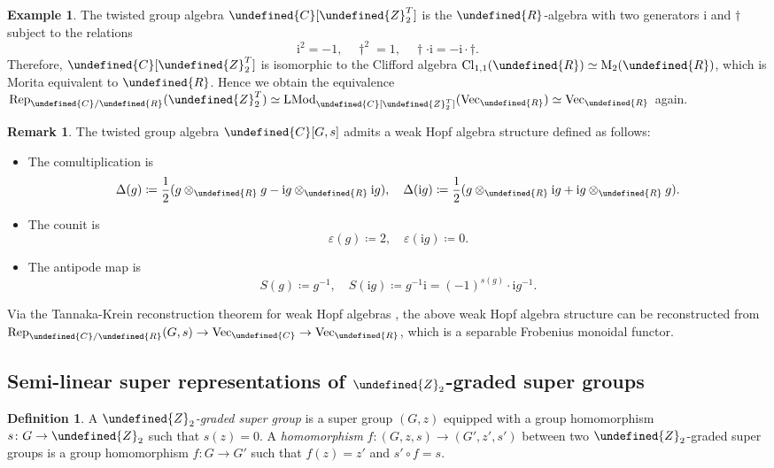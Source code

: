\documentclass[10pt]{article}
\let\mathbb\undefined
\theoremstyle{definition}
\newtheorem{defn}[thm]{Definition}
\newtheorem{expl}[thm]{Example}
\newtheorem{rem}[thm]{Remark}
\numberwithin{equation}{section}
\numberwithin{thm}{section}
\newcommand{\bit}{\begin{itemize}}
\newcommand{\eit}{\end{itemize}}
\newcommand{\Cb}{\mathbb{C}}
\newcommand{\Rb}{\mathbb{R}}
\newcommand{\Zb}{\mathbb{Z}}
\DeclareMathOperator{\LMod}{LMod}
\newcommand{\vect}{\mathrm{Vec}}
\newcommand{\rep}{\mathrm{Rep}}
\begin{document}
\begin{expl}
The twisted group algebra $\Cb[\Zb_2^T]$ is the $\Rb$-algebra with two generators $\mathrm i$ and $\dagger$ subject to the relations
\[
\mathrm i^2 = -1 , \quad \dagger^2 = 1 , \quad \dagger \cdot \mathrm i = -\mathrm i \cdot \dagger .
\]
Therefore, $\Cb[\Zb_2^T]$ is isomorphic to the Clifford algebra $\mathrm{Cl}_{1,1}(\Rb) \simeq \mathrm M_2(\Rb)$, which is Morita equivalent to $\Rb$. Hence we obtain the equivalence $\rep_{\Cb/\Rb}(\Zb_2^T) \simeq \LMod_{\Cb[\Zb_2^T]}(\vect_\Rb) \simeq \vect_\Rb$ again.
\end{expl}

\begin{rem}
The twisted group algebra $\Cb[G,s]$ admits a weak Hopf algebra structure defined as follows:
\bit
\item The comultiplication is
\[
\Delta(g) \coloneqq \frac12 (g \otimes_\Rb g - \mathrm i g \otimes_\Rb \mathrm i g) , \quad \Delta(\mathrm i g) \coloneqq \frac12 (g \otimes_\Rb \mathrm i g + \mathrm i g \otimes_\Rb g) .
\]
\item The counit is
\[
\varepsilon(g) \coloneqq 2 , \quad \varepsilon(\mathrm i g) \coloneqq 0 .
\]
\item The antipode map is
\[
S(g) \coloneqq g^{-1} , \quad S(\mathrm i g) \coloneqq g^{-1} \mathrm i = (-1)^{s(g)} \cdot \mathrm i g^{-1} .
\]
\eit
Via the Tannaka-Krein reconstruction theorem for weak Hopf algebras \cite{Szl01,Szl05}, the above weak Hopf algebra structure can be reconstructed from $\rep_{\Cb/\Rb}(G,s) \to \vect_\Cb \to \vect_\Rb$, which is a separable Frobenius monoidal functor.
\end{rem}


\subsection{Semi-linear super representations of \texorpdfstring{$\Zb_2$}{Z2}-graded super groups}

\begin{defn}
A \emph{$\Zb_2$-graded super group} is a super group $(G,z)$ equipped with a group homomorphism $s \colon G \to \Zb_2$ such that $s(z) = 0$. A \emph{homomorphism} $f \colon (G,z,s) \to (G',z',s')$ between two $\Zb_2$-graded super groups is a group homomorphism $f \colon G \to G'$ such that $f(z) = z'$ and $s' \circ f = s$.
\end{defn}
\end{document}
